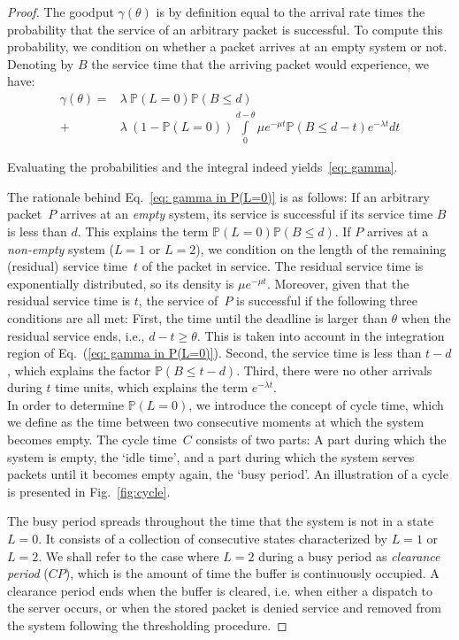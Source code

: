 \documentclass[preprint,12pt]{elsarticle}
\theoremstyle{definition}
\theoremstyle{plain}
\theoremstyle{remark}
\renewcommand{\P}{\ensuremath{\mathbb{P}}}
\newcommand{\e}{e}
\begin{document}
\begin{proof}
  The goodput $\gamma(\theta)$ is by definition equal to the arrival rate times the probability that the service of an arbitrary packet is successful. To compute this probability, we condition on whether a packet arrives at an empty system or not. Denoting by $B$ the service time that the arriving packet would experience, we have:
  \begin{equation}\label{eq: gamma in P(L=0)}
  \begin{split}
    \gamma(\theta) =& \lambda\:\P(L=0) \P(B \leq d)\\
              +& \lambda\:(1-\P(L=0))\int\limits_0^{d-\theta} \mu \e^{-\mu t} \P(B\leq d-t) \e^{-\lambda t}  dt
  \end{split}
  \end{equation}

  Evaluating the probabilities and the integral indeed yields~\eqref{eq: gamma}.

The rationale behind Eq.~\eqref{eq: gamma in P(L=0)} is as follows: If an arbitrary packet~$P$ arrives at an \emph{empty} system, its service is successful if its service time $B$ is less than $d$. This explains the term $\P(L=0) \P(B \leq d)$. If $P$ arrives at a \emph{non-empty} system ($L = 1$ or $L = 2$), we condition on the length of the remaining (residual) service time~$t$ of the packet in service. The residual service time is exponentially distributed, so its density is $\mu \e^{-\mu t}$. Moreover, given that the residual service time is $t$, the service of~$P$ is successful if the following three conditions are all met: First, the time until the deadline is larger than $\theta$ when the residual service ends, i.e., $d-t\geq \theta$. This is taken into account in the integration region of Eq.~(\ref{eq: gamma in P(L=0)}). Second, the service time is less than $t-d$, which explains the factor $\P(B\leq t-d)$. Third, there were no other arrivals during $t$ time units, which explains the term $\e^{-\lambda t}$.\\


In order to determine $\P(L=0)$, we introduce the concept of cycle time, which we define as the time between two consecutive moments at which the system becomes empty. The cycle time~$C$ consists of two parts: A part during which the system is empty, the `idle time', and a part during which the system serves packets until it becomes empty again, the `busy period'. An illustration of a cycle is presented in Fig.~\ref{fig:cycle}.

The busy period spreads throughout the time that the system is not in a state $L = 0$. It consists of a collection of consecutive states characterized by $L = 1$ or $L = 2$. We shall refer to the case where $L = 2$ during a busy period as \textit{clearance period} ($CP$), which is the amount of time the buffer is continuously occupied. A clearance period ends when the buffer is cleared, i.e. when either a dispatch to the server occurs, or when the stored packet is denied service and removed from the system following the thresholding procedure.



\end{proof}
\end{document}
